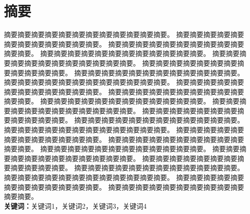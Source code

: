 
{
\chapter{摘要}
摘要摘要摘要摘要摘要摘要摘要摘要摘要摘要摘要摘要。
摘要摘要摘要摘要摘要摘要摘要摘要摘要摘要摘要摘要。
摘要摘要摘要摘要摘要摘要摘要摘要摘要摘要摘要摘要。
摘要摘要摘要摘要摘要摘要摘要摘要摘要摘要摘要摘要。
摘要摘要摘要摘要摘要摘要摘要摘要摘要摘要摘要摘要。
摘要摘要摘要摘要摘要摘要摘要摘要摘要摘要摘要摘要。
摘要摘要摘要摘要摘要摘要摘要摘要摘要摘要摘要摘要。
摘要摘要摘要摘要摘要摘要摘要摘要摘要摘要摘要摘要。
摘要摘要摘要摘要摘要摘要摘要摘要摘要摘要摘要摘要。
摘要摘要摘要摘要摘要摘要摘要摘要摘要摘要摘要摘要。
摘要摘要摘要摘要摘要摘要摘要摘要摘要摘要摘要摘要。
摘要摘要摘要摘要摘要摘要摘要摘要摘要摘要摘要摘要。
摘要摘要摘要摘要摘要摘要摘要摘要摘要摘要摘要摘要。
摘要摘要摘要摘要摘要摘要摘要摘要摘要摘要摘要摘要。
摘要摘要摘要摘要摘要摘要摘要摘要摘要摘要摘要摘要。
摘要摘要摘要摘要摘要摘要摘要摘要摘要摘要摘要摘要。
摘要摘要摘要摘要摘要摘要摘要摘要摘要摘要摘要摘要。
摘要摘要摘要摘要摘要摘要摘要摘要摘要摘要摘要摘要。
摘要摘要摘要摘要摘要摘要摘要摘要摘要摘要摘要摘要。
摘要摘要摘要摘要摘要摘要摘要摘要摘要摘要摘要摘要。
摘要摘要摘要摘要摘要摘要摘要摘要摘要摘要摘要摘要。
摘要摘要摘要摘要摘要摘要摘要摘要摘要摘要摘要摘要。
摘要摘要摘要摘要摘要摘要摘要摘要摘要摘要摘要摘要。
摘要摘要摘要摘要摘要摘要摘要摘要摘要摘要摘要摘要。\\ 

\noindent \textbf{关键词：}关键词1，关键词2，关键词3，关键词4

\clearpage
}
